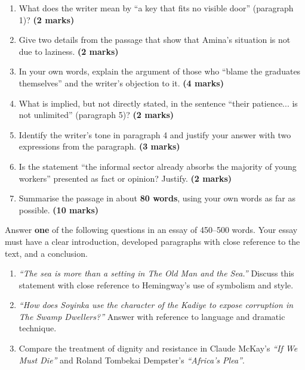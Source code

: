 \documentclass[11pt]{article}
\begin{document}
\begin{exercice}
\begin{enumerate}
\item What does the writer mean by ``a key that fits no visible door'' (paragraph 1)? \textbf{(2 marks)}
\item Give two details from the passage that show that Amina's situation is not due to laziness. \textbf{(2 marks)}
\item In your own words, explain the argument of those who ``blame the graduates themselves'' and the writer's objection to it. \textbf{(4 marks)}
\item What is implied, but not directly stated, in the sentence ``their patience... is not unlimited'' (paragraph 5)? \textbf{(2 marks)}
\item Identify the writer's tone in paragraph 4 and justify your answer with two expressions from the paragraph. \textbf{(3 marks)}
\item Is the statement ``the informal sector already absorbs the majority of young workers'' presented as fact or opinion? Justify. \textbf{(2 marks)}
\item Summarise the passage in about \textbf{80 words}, using your own words as far as possible. \textbf{(10 marks)}
\end{enumerate}
\end{exercice}

\begin{exercice}
Answer \textbf{one} of the following questions in an essay of 450--500 words. Your essay must have a clear introduction, developed paragraphs with close reference to the text, and a conclusion.
\begin{enumerate}
\item \emph{``The sea is more than a setting in The Old Man and the Sea.''} Discuss this statement with close reference to Hemingway's use of symbolism and style.
\item \emph{``How does Soyinka use the character of the Kadiye to expose corruption in The Swamp Dwellers?''} Answer with reference to language and dramatic technique.
\item Compare the treatment of dignity and resistance in Claude McKay's \emph{``If We Must Die''} and Roland Tombekai Dempster's \emph{``Africa's Plea''}.
\end{enumerate}
\end{exercice}
\end{document}
